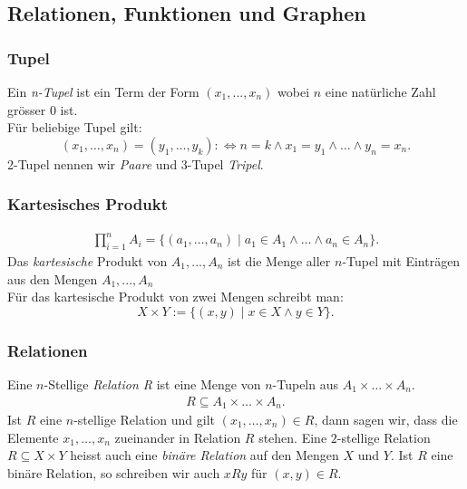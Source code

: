 \subsection{Relationen, Funktionen und Graphen}%
\label{sub:Relatiinen, Funktionen und Graphen}

\subsubsection{Tupel}%
\label{ssub:tupel}
Ein \textit{n-Tupel} ist ein Term der Form $(x_1,...,x_n)$ wobei $n$ eine natürliche Zahl grösser $0$ ist. \\
Für beliebige Tupel gilt:
\begin{equation}
	(x_1,\dots,x_n)=(y_1,\dots,y_k):\Leftrightarrow n=k\land x_1=y_1\land\dots\land y_n=x_n.
\end{equation}
2-Tupel nennen wir \textit{Paare} und 3-Tupel \textit{Tripel}.

\subsubsection{Kartesisches Produkt}%
\label{ssub:kartesisches_produkt}
\begin{minipage}{0.9\linewidth}
\begin{align*}
\prod_{i=1}^{n}A_i=\big\{(a_1,\dots,a_n)\mid a_1\in A_1\land\dots\land a_n\in A_n \big\}.
\end{align*}
Das \textit{kartesische} Produkt von $A_1, ..., A_n$ ist die Menge aller $n$-Tupel mit Einträgen aus den Mengen $A_1,
..., A_n$ 
\\
Für das kartesische Produkt von zwei Mengen schreibt man:
\[
X\times Y:=\{(x,y)\mid x\in X\land y\in Y \}.
\]
\end{minipage}

\subsubsection{Relationen}%
\label{ssub:relationen}
\begin{minipage}{0.9\linewidth}
Eine $n$-Stellige \textit{Relation R} ist eine Menge von $n$-Tupeln aus $A_1 \times \dots \times A_n$.
\begin{align*}
R\subseteq A_1\times\dots \times A_n.
\end{align*}
Ist $R$ eine $n$-stellige Relation und gilt $(x_1,\dots,x_n)\in R$, dann sagen wir, dass die Elemente $x_1,\dots,x_n$ zueinander in Relation $R$ stehen.
Eine $2$-stellige Relation $R\subseteq X\times Y$ heisst auch eine \textit{binäre Relation} auf den Mengen $X$ und $Y$. Ist $R$ eine binäre Relation, so schreiben wir auch $xRy$ für $(x,y)\in R$.
\end{minipage}


